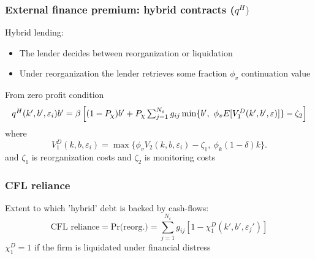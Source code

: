 \documentclass[notes]{beamer}
\begin{document}
\begin{frame}[label=hybrid] \frametitle{External finance premium: hybrid contracts ($q^{H})$}

Hybrid lending: 
\begin{itemize} \setlength\itemsep{0em}
    \item The lender decides between reorganization or liquidation
    \item Under reorganization the lender retrieves some fraction $\phi_v$ continuation value
\end{itemize}
From zero profit condition
\begin{equation*}
    \resizebox{1\hsize}{!}{$
    q^H(k',b',\varepsilon_i)b' = \beta \left[ (1-P_\chi) b' + P_\chi \sum_{j=1}^{N_\varepsilon} g_{ij}  \min\{b', \ \phi_v E[V^D_1(k',b',\varepsilon)]  \} - \zeta_2 \right]
    $}
\end{equation*}
where 
$$V_1^D(k,b,\varepsilon_i) = \max \Big\{ \phi_vV_2(k,b,\varepsilon_i)- \zeta_1, \  \phi_k (1-\delta) k \Big\}.$$
and $\zeta_1$ is reorganization costs and $\zeta_2$ is monitoring costs
\begin{center}
\hyperlink{fc}{}
\hspace{10mm}
\hyperlink{assumpt}{}
\end{center}
\end{frame}


\begin{frame}[label=CFLrel] 
\frametitle{CFL reliance}
Extent to which 'hybrid' debt is backed by cash-flows: 
$$ \text{CFL reliance}  = \text{Pr(reorg.)} = \sum_{j = 1}^{N_\varepsilon} g_{ij} \left[ 1-\chi_1^D(k',b',\varepsilon_j')\right]  $$
$\chi_1^D = 1$ if the firm is liquidated under financial distress

\vfill

\begin{center}
\hyperlink{intuition}{}
\end{center}

\end{frame}


\end{document}
